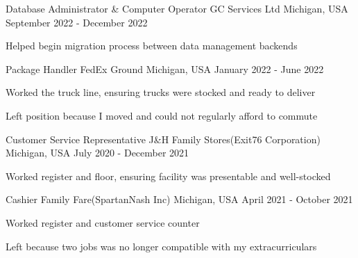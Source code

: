 
\begin{cventries}

   \cventry
   {Database Administrator \& Computer Operator} %
   {GC Services Ltd} %
   {Michigan, USA} %
   {September 2022 - December 2022} %
   {
      \begin{cvitems}
         \item {Helped begin migration process between data management backends}
      \end{cvitems}
   }

   \cventry
   {Package Handler} %
   {FedEx Ground} %
   {Michigan, USA} %
   {January 2022 - June 2022} %
   {
      \begin{cvitems}
         \item {Worked the truck line, ensuring trucks were stocked and ready to deliver}
         \item {Left position because I moved and could not regularly afford to commute}
      \end{cvitems}
   }

   \cventry
   {Customer Service Representative} %
   {J\&H Family Stores(Exit76 Corporation)} %
   {Michigan, USA} %
   {July 2020 - December 2021} %
   {
      \begin{cvitems}
         \item {Worked register and floor, ensuring facility was presentable and well-stocked}
      \end{cvitems}
   }

   \cventry
   {Cashier} %
   {Family Fare(SpartanNash Inc)} %
   {Michigan, USA} %
   {April 2021 - October 2021} %
   {
      \begin{cvitems}
         \item {Worked register and customer service counter}
         \item {Left because two jobs was no longer compatible with my extracurriculars}
      \end{cvitems}
   }


\end{cventries}
